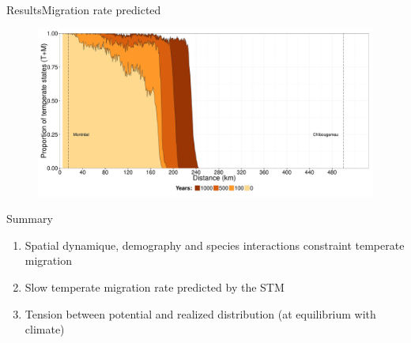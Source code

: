 \documentclass[10pt,aspectratio=149]{beamer}
\begin{document}

\begin{frame}[t]{Results}{Migration rate predicted}

		\begin{figure}
			\includegraphics[width=0.9\paperwidth]{Figs/fut_range.pdf}
		\end{figure}

\end{frame}



\begin{frame}{Summary}

		\begin{enumerate}
			\item Spatial dynamique, demography and species interactions constraint temperate migration
			\item Slow temperate migration rate predicted by the STM
			\item Tension between potential and realized distribution (at equilibrium with climate)
		\end{enumerate}
\end{frame}


\end{document}
